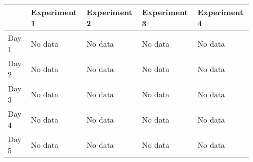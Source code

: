 \begin{table}
\begin{adjustwidth}{-2cm}{}
\centering
\begin{tabular}{ l | l | l | l | l }

 & Experiment 1 & Experiment 2 & Experiment 3 & Experiment 4\\
\hline
Day 1  & No data & No data & No data & No data\\
\hline
Day 2  & No data & No data & No data & No data\\
\hline
Day 3  & No data & No data & No data & No data\\
\hline
Day 4  & No data & No data & No data & No data\\
\hline
Day 5  & No data & No data & No data & No data\\
\hline
\end{tabular}
\end{adjustwidth}
\end{table}
